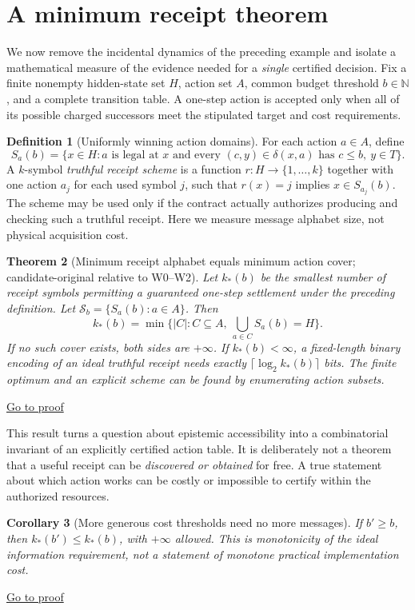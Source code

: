 \documentclass[11pt,letterpaper]{article}
\newtheorem{theorem}{Theorem}[section]
\newtheorem{corollary}[theorem]{Corollary}
\theoremstyle{definition}
\newtheorem{definition}[theorem]{Definition}
\theoremstyle{remark}
\newcommand{\N}{\mathbb{N}}
\newcommand{\backproof}[1]{\hfill\hyperlink{proof:#1}{\footnotesize Go to proof}}
\begin{document}
\section{A minimum receipt theorem}
We now remove the incidental dynamics of the preceding example and isolate a mathematical measure of the evidence needed for a \emph{single} certified decision. Fix a finite nonempty hidden-state set $H$, action set $A$, common budget threshold $b\in\N$, and a complete transition table. A one-step action is accepted only when all of its possible charged successors meet the stipulated target and cost requirements.

\begin{definition}[Uniformly winning action domains]
For each action $a\in A$, define
\[
 S_a(b)=\big\{x\in H: a\text{ is legal at }x\text{ and every }(c,y)\in\delta(x,a)\text{ has }c\le b,\ y\in T\big\}.
\]
A $k$-symbol \emph{truthful receipt scheme} is a function $r:H\to\{1,\ldots,k\}$ together with one action $a_j$ for each used symbol $j$, such that $r(x)=j$ implies $x\in S_{a_j}(b)$. The scheme may be used only if the contract actually authorizes producing and checking such a truthful receipt. Here we measure message alphabet size, not physical acquisition cost.
\end{definition}

\begin{theorem}[Minimum receipt alphabet equals minimum action cover; candidate-original relative to W0--W2]\label{thm:cover}\hypertarget{stmt:cover}{}
Let $k_*(b)$ be the smallest number of receipt symbols permitting a guaranteed one-step settlement under the preceding definition. Let $\mathcal S_b=\{S_a(b):a\in A\}$. Then
\[
\boxed{\quad k_*(b)=\min\Big\{|C|:C\subseteq A,\ \bigcup_{a\in C}S_a(b)=H\Big\}.\quad}
\]
If no such cover exists, both sides are $+\infty$. If $k_*(b)<\infty$, a fixed-length binary encoding of an ideal truthful receipt needs exactly $\lceil\log_2 k_*(b)\rceil$ bits. The finite optimum and an explicit scheme can be found by enumerating action subsets.
\end{theorem}\backproof{cover}

This result turns a question about epistemic accessibility into a combinatorial invariant of an explicitly certified action table. It is deliberately not a theorem that a useful receipt can be \emph{discovered or obtained} for free. A true statement about which action works can be costly or impossible to certify within the authorized resources.

\begin{corollary}[More generous cost thresholds need no more messages]\label{cor:monob}\hypertarget{stmt:monob}{}
If $b'\ge b$, then $k_*(b')\le k_*(b)$, with $+\infty$ allowed. This is monotonicity of the ideal information requirement, not a statement of monotone practical implementation cost.
\end{corollary}\backproof{monob}
\end{document}
